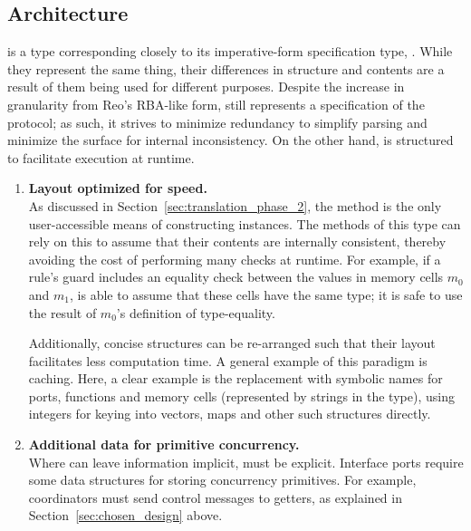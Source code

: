 \subsection{Architecture}
\label{sec:protocol_object_architecture}
 is a type corresponding closely to its imperative-form specification type, . While they represent the same thing, their differences in structure and contents are a result of them being used for different purposes. Despite the increase in granularity from Reo's RBA-like form,  still represents a specification of the protocol; as such, it strives to minimize redundancy to simplify parsing and minimize the surface for internal inconsistency. On the other hand,  is structured to facilitate execution at runtime.

\begin{enumerate}
	\item \textbf{Layout optimized for speed.}\\
	As discussed in Section~\ref{sec:translation_phase_2}, the  method is the only user-accessible means of constructing  instances. The methods of this type can rely on this to assume that their contents are internally consistent, thereby avoiding the cost of performing many checks at runtime. For example, if a rule's guard includes an equality check between the values in memory cells $m_0$ and $m_1$,  is able to assume that these cells have the same type; it is safe to use the result of $m_0$'s definition of type-equality.
	
	Additionally, concise structures can be re-arranged such that their layout facilitates less computation time. A general example of this paradigm is caching. Here, a clear example is the replacement with symbolic names for ports, functions and memory cells (represented by strings in the  type), using integers for keying into vectors, maps and other such structures directly.
	
	\item \textbf{Additional data for primitive concurrency.}\\
	Where  can leave information implicit,  must be explicit. Interface ports require some data structures for storing concurrency primitives. For example, coordinators must send control messages to getters, as explained in Section~\ref{sec:chosen_design} above. 
\end{enumerate}

